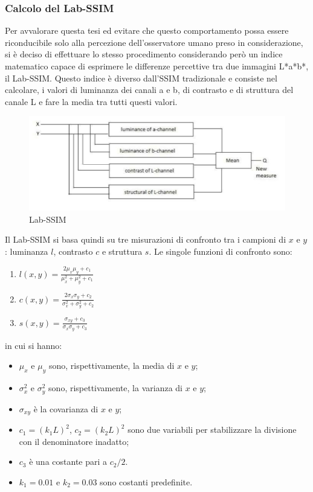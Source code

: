 \documentclass[a4paper,11pt]{article}
\begin{document}
    \subsubsection{Calcolo del Lab-SSIM}
    Per avvalorare questa tesi ed evitare che questo comportamento possa essere riconducibile solo alla percezione dell'osservatore umano preso in considerazione, si è deciso
    di effettuare lo stesso procedimento considerando però un indice matematico capace di esprimere le differenze percettive tra due immagini L*a*b*, il Lab-SSIM.
    Questo indice è diverso dall'SSIM tradizionale e consiste nel calcolare, i valori di luminanza dei canali a e b, di contrasto e di struttura del canale L e fare la media tra tutti questi valori.
    \begin{figure}[h]
        \centering
        \includegraphics[scale=0.7]{labssim.png}
        \caption{Lab-SSIM}
    \end{figure}

    Il Lab-SSIM si basa quindi su tre misurazioni di confronto tra i campioni di $x$ e $y$: luminanza $l$, contrasto $c$ e struttura $s$. Le singole funzioni di confronto sono:
    \begin{enumerate} 
        \item $l(x,y)=\frac{2\mu_x\mu_y + c_1}{\mu^2_x + \mu^2_y + c_1}$
        \item $c(x,y)=\frac{2\sigma_x\sigma_y + c_2}{\sigma^2_x + \sigma^2_y + c_2}$
        \item $s(x,y)=\frac{\sigma_{xy} + c_3}{\sigma_x \sigma_y + c_3}$
    \end{enumerate}
    in cui si hanno:
    \begin{itemize} 
        \item $\mu_x$ e $\mu_y$ sono, rispettivamente, la media di $x$ e $y$;
        \item $\sigma_x^2$ e $\sigma_y^2$ sono, rispettivamente, la varianza di $x$ e $y$;
        \item $\sigma_{xy}$ è la covarianza di $x$ e $y$;
        \item $c_1=(k_1L)^2$, $c_2=(k_2L)^2$ sono due variabili per stabilizzare la divisione con il denominatore inadatto;
        \item $c_3$ è una costante pari a $c_2 / 2$.
        \item $k_1=0.01$ e $k_2=0.03$ sono costanti predefinite.
   \end{itemize}
   \newpage
    
\end{document}
